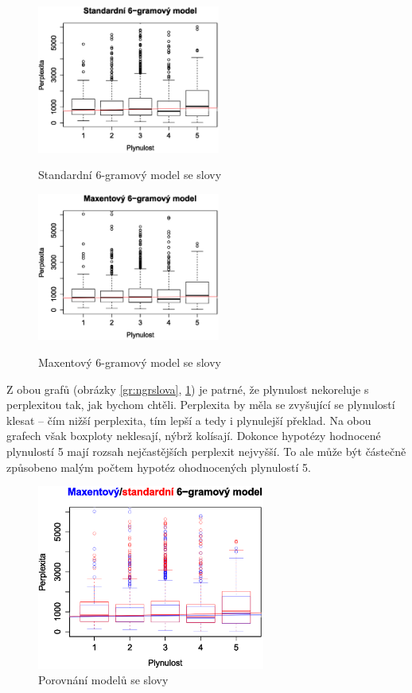 \documentclass[12pt,a4paper]{report}
\begin{document}
\begin{figure}[!htb]
\begin{center}
  \centering\includegraphics[width=60mm]{./grafy/morf/ngram/text.svg.eps}
  \caption{Standardní 6-gramový model se slovy}\label{gr:ngrslova}
\endminipage\quad
{}
  \centering\includegraphics[width=60mm]{./grafy/morf/maxent/text.svg.eps}
  \caption{Maxentový 6-gramový model se slovy}\label{gr:maxslova}
\endminipage
\end{center}
\end{figure}




Z obou grafů (obrázky \ref{gr:ngrslova}, \ref{gr:maxslova}) je patrné, že plynulost nekoreluje s perplexitou tak, jak bychom chtěli. Perplexita by měla se zvyšující se plynulostí klesat -- čím nižší perplexita, tím lepší a tedy i plynulejší překlad. Na obou grafech však box\-ploty neklesají, nýbrž kolísají. Dokonce hypotézy hodnocené plynulostí 5 mají rozsah nejčastějších perplexit nejvyšší. To ale může být částečně způsobeno malým počtem hypotéz ohodnocených plynulostí 5.


\begin{figure}[!htbp]
\begin{center}
	\centering
	\includegraphics[width=75mm]{./grafy/morf/porovnani/text.svg.eps}
	\caption{Porovnání modelů se slovy}\label{gr:porslova}
\endminipage
\end{center}
\end{figure}
\end{document}
